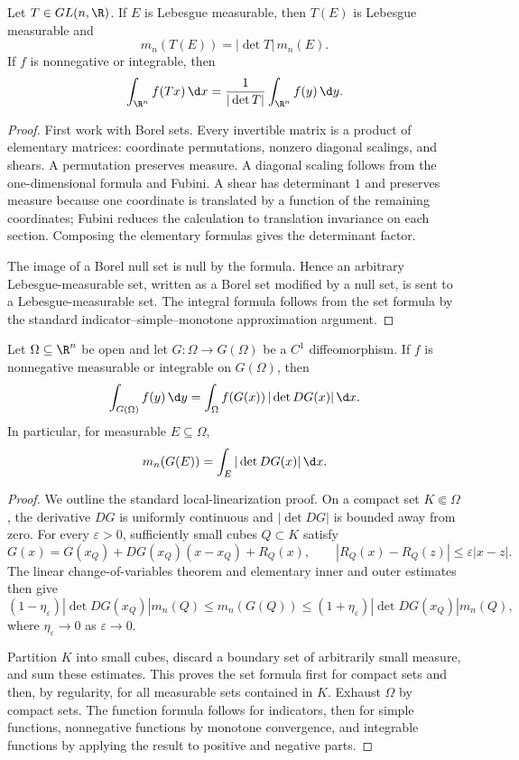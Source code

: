 \begin{thm}
Let $T\in GL(n,\R)$. If $E$ is Lebesgue measurable, then $T(E)$ is Lebesgue measurable and
\[
m_n(T(E))=|\det T|\,m_n(E).
\]
If $f$ is nonnegative or integrable, then
\[
\int_{\R^n}f(Tx)\,\d x
 =\frac1{|\det T|}\int_{\R^n}f(y)\,\d y.
\]
\end{thm}

\begin{proof}
First work with Borel sets. Every invertible matrix is a product of elementary matrices: coordinate permutations, nonzero diagonal scalings, and shears. A permutation preserves measure. A diagonal scaling follows from the one-dimensional formula and Fubini. A shear has determinant $1$ and preserves measure because one coordinate is translated by a function of the remaining coordinates; Fubini reduces the calculation to translation invariance on each section. Composing the elementary formulas gives the determinant factor.

The image of a Borel null set is null by the formula. Hence an arbitrary Lebesgue-measurable set, written as a Borel set modified by a null set, is sent to a Lebesgue-measurable set. The integral formula follows from the set formula by the standard indicator--simple--monotone approximation argument.
\end{proof}

\begin{thm}
Let $\Omega\subseteq\R^n$ be open and let $G:\Omega\to G(\Omega)$ be a $C^1$ diffeomorphism. If $f$ is nonnegative measurable or integrable on $G(\Omega)$, then
\[
\int_{G(\Omega)}f(y)\,\d y
 =\int_\Omega f(G(x))\,|\det DG(x)|\,\d x.
\]
In particular, for measurable $E\subseteq\Omega$,
\[
m_n(G(E))=\int_E|\det DG(x)|\,\d x.
\]
\end{thm}

\begin{proof}
We outline the standard local-linearization proof. On a compact set $K\Subset\Omega$, the derivative $DG$ is uniformly continuous and $|\det DG|$ is bounded away from zero. For every $\varepsilon>0$, sufficiently small cubes $Q\subset K$ satisfy
\[
G(x)=G(x_Q)+DG(x_Q)(x-x_Q)+R_Q(x),
\qquad
|R_Q(x)-R_Q(z)|\leq\varepsilon|x-z|.
\]
The linear change-of-variables theorem and elementary inner and outer estimates then give
\[
(1-\eta_\varepsilon)|\det DG(x_Q)|m_n(Q)
 \leq m_n(G(Q))
 \leq(1+\eta_\varepsilon)|\det DG(x_Q)|m_n(Q),
\]
where $\eta_\varepsilon\to0$ as $\varepsilon\to0$.

Partition $K$ into small cubes, discard a boundary set of arbitrarily small measure, and sum these estimates. This proves the set formula first for compact sets and then, by regularity, for all measurable sets contained in $K$. Exhaust $\Omega$ by compact sets. The function formula follows for indicators, then for simple functions, nonnegative functions by monotone convergence, and integrable functions by applying the result to positive and negative parts.
\end{proof}

